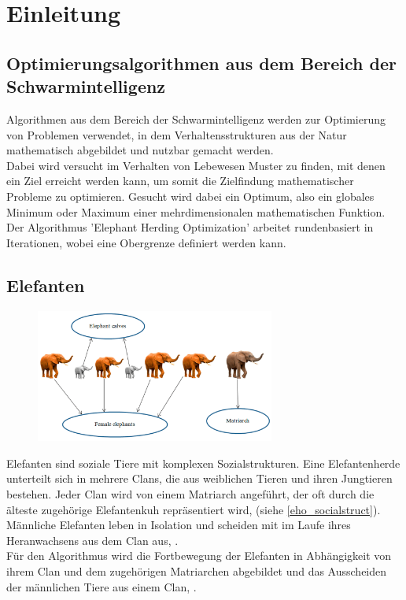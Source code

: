 \chapter{Einleitung}

\section{Optimierungsalgorithmen aus dem Bereich der Schwarmintelligenz}
Algorithmen aus dem Bereich der Schwarmintelligenz werden zur Optimierung von Problemen verwendet, in dem Verhaltensstrukturen aus der Natur mathematisch abgebildet und nutzbar gemacht werden.\\
Dabei wird versucht im Verhalten von Lebewesen Muster zu finden, mit denen ein Ziel erreicht werden kann, um somit die Zielfindung mathematischer Probleme zu optimieren. Gesucht wird dabei ein Optimum, also ein globales Minimum oder Maximum einer mehrdimensionalen mathematischen Funktion.\\
Der Algorithmus 'Elephant Herding Optimization' arbeitet rundenbasiert in Iterationen, wobei eine Obergrenze definiert werden kann.

\section{Elefanten} 
\begin{figure}[ht]
    \begin{center}
        \includegraphics[width=0.7\textwidth]{assets/img/eho_socialstruct.png}
        \caption[EHO Social Structure in a clan]{\cite[Li et al, S.3]{li_lei_alavi_wang_2020}}
        \label{eho_socialstruct}
    \end{center}
\end{figure}
Elefanten sind soziale Tiere mit komplexen Sozialstrukturen. Eine Elefantenherde unterteilt sich in mehrere Clans, die aus weiblichen Tieren und ihren Jungtieren bestehen. Jeder Clan wird von einem Matriarch angeführt, der oft durch die älteste zugehörige Elefantenkuh repräsentiert wird, (siehe \autoref{eho_socialstruct}). Männliche Elefanten leben in Isolation und scheiden mit im Laufe ihres Heranwachsens aus dem Clan aus, \cite[vgl. Wang et al. 2015, S.1]{wang_deb_coelho_2015}. \\
Für den Algorithmus wird die Fortbewegung der Elefanten in Abhängigkeit von ihrem Clan und dem zugehörigen Matriarchen abgebildet und das Ausscheiden der männlichen Tiere aus einem Clan, \cite[vgl. Wang et al, S.1]{wang_deb_coelho_2015}. 

